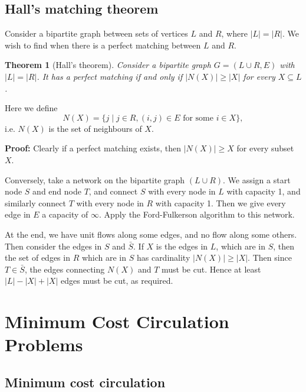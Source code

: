 \documentclass[12pt]{article}
\newtheorem{theorem}{Theorem}[section]
\theoremstyle{definition}
\theoremstyle{remark}
\begin{document}
\subsection{Hall's matching theorem}%
\label{sub:hall_s_matching_theorem}

Consider a bipartite graph between sets of vertices $L$ and $R$, where $|L| = |R|$. We wish to find when there is a perfect matching between $L$ and $R$.

\begin{theorem}[Hall's theorem]
	Consider a bipartite graph $G = (L \cup R, E)$ with $|L| = |R|$. It has a perfect matching if and only if $|N(X)| \geq |X|$ for every $X \subseteq L$.
\end{theorem}
Here we define
\[
	N(X) = \{j \mid j \in R, (i, j) \in E \text{ for some } i \in X\}
,\]
i.e. $N(X)$ is the set of neighbours of $X$.

\begin{adjustbox}{minipage = \columnwidth - 25.5pt, margin=1em, frame=1pt, margin=0em}
	\textbf{Proof:} Clearly if a perfect matching exists, then $|N(X)| \geq X$ for every subset $X$.

	Conversely, take a network on the bipartite graph $(L \cup R)$. We assign a start node $S$ and end node $T$, and connect $S$ with every node in $L$ with capacity 1, and similarly connect $T$ with every node in $R$ with capacity 1. Then we give every edge in $E$ a capacity of $\infty$. Apply the Ford-Fulkerson algorithm to this network.

	At the end, we have unit flows along some edges, and no flow along some others. Then consider the edges in $S$ and $\bar S$. If $X$ is the edges in $L$, which are in $S$, then the set of edges in $R$ which are in $S$ has cardinality $|N(X)| \geq |X|$. Then since $T \in \bar S$, the edges connecting $N(X)$ and $T$ must be cut. Hence at least $|L| - |X| + |X|$ edges must be cut, as required.
\end{adjustbox}

\newpage

\section{Minimum Cost Circulation Problems}%
\label{sec:minimum_cost_circulation_problems}

\subsection{Minimum cost circulation}%
\label{sub:minimum_cost_circulation}
\end{document}
